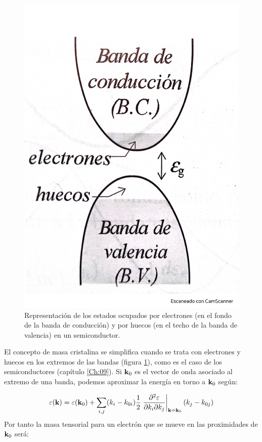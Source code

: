 \begin{figure}[h!] \centering
	\includegraphics[scale=0.3]{Cuerpo/Ch_08/Fotos libro 1.pdf}
	\caption{Representación de los estados ocupados por electrones (en el fondo de la banda de conducción) y por huecos (en el techo de la banda de valencia) en un semiconductor.}
	\label{Fig:08-01}
\end{figure}


El concepto de masa cristalina se simplifica cuando se trata con electrones y huecos en los extremos de las bandas (figura \ref{Fig:08-01}), como es el caso de los semiconductores (capítulo \ref{Ch:09}). Si $\mathbf{k}_0$ es el vector de onda asociado al extremo de una banda, podemos aproximar la energía en torno a $\mathbf{k}_0$ según:

\begin{equation}
	\varepsilon(\mathbf{k}) = \varepsilon(\mathbf{k}_0) + \sum_{i,j} (k_i - k_{0i}) \frac{1}{2} \left. \frac{\partial ^2 \varepsilon}{\partial  k_i \partial k_j} \right|_{\mathbf{k}=\mathbf{k}_0} (k_j - k_{0j}) \label{Ec:08-02-04}
\end{equation} 
Por tanto la masa tensorial para un electrón que se mueve en las proximidades de $\mathbf{k}_0$ será:

